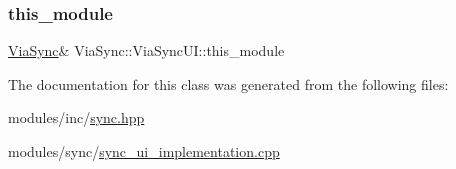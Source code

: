 \subsubsection{\texorpdfstring{this\+\_\+module}{this\_module}}
{\footnotesize\ttfamily \mbox{\hyperlink{class_via_sync}{Via\+Sync}}\& Via\+Sync\+::\+Via\+Sync\+U\+I\+::this\+\_\+module}



The documentation for this class was generated from the following files\+:\begin{DoxyCompactItemize}
\item 
modules/inc/\mbox{\hyperlink{sync_8hpp}{sync.\+hpp}}\item 
modules/sync/\mbox{\hyperlink{sync__ui__implementation_8cpp}{sync\+\_\+ui\+\_\+implementation.\+cpp}}\end{DoxyCompactItemize}
